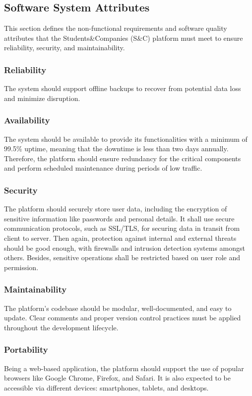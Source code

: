\subsection{Software System Attributes}

This section defines the non-functional requirements and software quality attributes that the Students\&Companies (S\&C) platform must meet to ensure reliability, security, and maintainability.

\subsubsection{Reliability}
 The system should support offline backups to recover from potential data loss and minimize disruption.
\subsubsection{Availability}
The system should be available to provide its functionalities with a minimum of 99.5\% uptime, meaning that the downtime is less than two days annually. Therefore, the platform should ensure redundancy for the critical components and perform scheduled maintenance during periods of low traffic.
\subsubsection{Security}
The platform should securely store user data, including the encryption of sensitive information like passwords and personal details. It shall use secure communication protocols, such as SSL/TLS, for securing data in transit from client to server. Then again, protection against internal and external threats should be good enough, with firewalls and intrusion detection systems amongst others. Besides, sensitive operations shall be restricted based on user role and permission.
\subsubsection{Maintainability}
The platform's codebase should be modular, well-documented, and easy to update. Clear comments and proper version control practices must be applied throughout the development lifecycle.
\subsubsection{Portability}
Being a web-based application, the platform should support the use of popular browsers like Google Chrome, Firefox, and Safari. It is also expected to be accessible via different devices: smartphones, tablets, and desktops.


